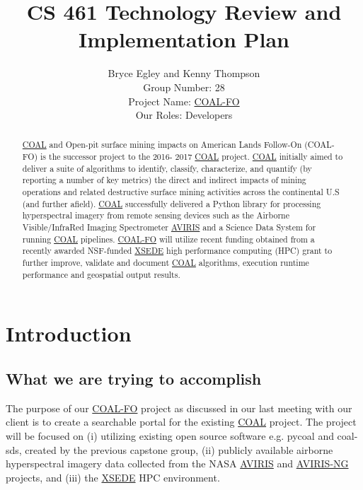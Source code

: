 \documentclass[10pt,draftclsnofoot,onecolumn,journal,compsoc]{IEEEtran}
\title{CS 461 Technology Review and Implementation Plan}
\author{Bryce Egley and Kenny Thompson \\ Group Number: 28 \\ Project Name: \href{http://eecs.oregonstate.edu/capstone/submission/?page=preview\&pid=320}{COAL-FO} \\ Our Roles: Developers}
\date{}
\begin{document}
\maketitle
  \begin{abstract}
	\href{https://capstone-coal.github.io/}{COAL} and Open-pit surface mining impacts on American Lands Follow-On (COAL-FO) is the successor project to the 2016-
2017 \href{https://capstone-coal.github.io/}{COAL} project. \href{https://capstone-coal.github.io/}{COAL} initially aimed to deliver a suite of algorithms to identify, classify, characterize, and quantify (by reporting a
number of key metrics) the direct and indirect impacts of mining operations and related destructive surface mining activities across the
continental U.S (and further afield). \href{https://capstone-coal.github.io/}{COAL} successfully delivered a Python library for processing hyperspectral imagery from remote
sensing devices such as the Airborne Visible/InfraRed Imaging Spectrometer \href{https://aviris.jpl.nasa.gov/}{AVIRIS} and a Science Data System for running \href{https://capstone-coal.github.io/}{COAL}
pipelines. \href{http://eecs.oregonstate.edu/capstone/cs/capstone.cgi?project=320}{COAL-FO} will utilize recent funding obtained from a recently awarded NSF-funded \href{https://www.xsede.org/}{XSEDE} high performance computing
(HPC) grant to further improve, validate and document \href{https://capstone-coal.github.io/}{COAL} algorithms, execution runtime performance and geospatial output
results.\cite{1}
  \end{abstract}
\newpage

\tableofcontents

\newpage

\section{Introduction}

\subsection{What we are trying to accomplish}

\noindent The purpose of our \href{http://eecs.oregonstate.edu/capstone/cs/capstone.cgi?project=320}{COAL-FO} project as discussed in our last meeting with our client is to create a searchable portal for the existing \href{https://capstone-coal.github.io/}{COAL} project. The project will be focused on (i) utilizing existing open source software e.g. pycoal and coal-sds, created by the previous capstone group, (ii) publicly available airborne hyperspectral imagery data collected from the NASA \href{https://aviris.jpl.nasa.gov/}{AVIRIS} and \href{https://aviris-ng.jpl.nasa.gov/}{AVIRIS-NG} projects, and (iii) the \href{https://www.xsede.org/}{XSEDE} HPC environment.\newline
\end{document}
